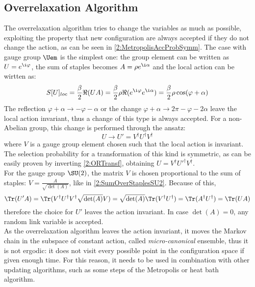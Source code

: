 \subsection{Overrelaxation Algorithm}
The overrelaxation algorithm tries to change the variables as much as possible, exploiting the property that new configuration are always accepted if they do not change the action, as can be seen in \eqref{2:MetropolisAccProbSymm}.
The case with gauge group $\Uem$ is the simplest one: the group element can be written as $U=e^{\i\varphi}$, the sum of staples becomes $A=\rho e^{\i\alpha}$ and the local action can be wirtten as:
\begin{equation}
    S[U]_{loc} = \frac\beta2 \Re(UA) = \frac\beta2 \rho \Re(e^{\i\varphi}e^{\i\alpha}) = \frac\beta2\rho\cos(\varphi+\alpha) \label{2:SlocORU1}  
\end{equation}
The reflection $\varphi+\alpha\to-\varphi-\alpha$ or the change $\varphi+\alpha\to2\pi-\varphi-2\alpha$ leave the local action invariant, thus a change of this type is always accepted.
For a non-Abelian group, this change is performed through the ansatz:
\begin{equation}
    U \to U' = V^\dagger U^\dagger V^\dagger \label{2:ORTransf}
\end{equation}
where $V$ is a gauge group element chosen such that the local action is invariant.
The selection probability for a transformation of this kind is symmetric, as can be easily proven by inverting \eqref{2:ORTransf}, obtaining $U = V^\dagger U'^\dagger V^\dagger$.\\
For the gauge group $\SU(2)$, the matrix $V$ is chosen proportional to the sum of staples: $V=\frac{A}{\sqrt{\det(A)}}$, like in \eqref{2:SumOverStaplesSU2}.
Because of this,
\begin{equation}
    \Tr(U'A) = \Tr(V^\dagger U^\dagger V^\dagger \sqrt{\det(A)} V) = \sqrt{\det(A)} \Tr(V^\dagger U^\dagger) = \Tr(A^\dagger U^\dagger) = \Tr(UA) \label{2:ORTrace}
\end{equation}
therefore the choice for $U'$ leaves the action invariant.
In case $\det(A)=0$, any random link variable is accepted.\\
As the overrelaxation algorithm leaves the action invariant, it moves the Markov chain in the subspace of constant action, called \emph{micro-canonical} ensemble, thus it is not ergodic: it does not visit every possible point in the configuration space if given enough time.
For this reason, it needs to be used in combination with other updating algorithms, such as some steps of the Metropolis or heat bath algorithm.

